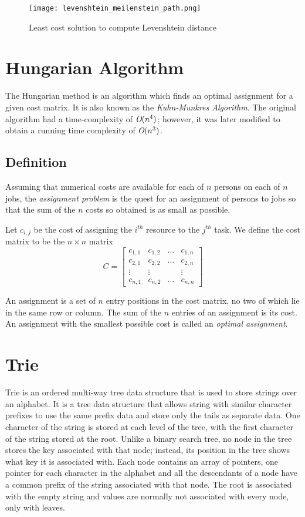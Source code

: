 			\begin{figure}[h!]
				\centering
				\texttt{[image: levenshtein\_meilenstein\_path.png]}
				\caption{Least cost solution to compute Levenshtein distance  \label{levenshtein_path}}
			\end{figure}

	\section{Hungarian Algorithm}
		The Hungarian method is an algorithm which finds an optimal assignment for a given cost matrix. It is also known as the \emph{Kuhn-Munkres Algorithm}. The original algorithm \cite{kuhn1955hungarian} had a time-complexity of \(\emph{O}(n^4)\); however, it was later modified to obtain a running time complexity of \(\emph{O}(n^3)\).
		
		\subsection{Definition}
			Assuming that numerical costs are available for each of \(n\) persons on each of \(n\) jobs, the \emph{assignment problem} is the quest for an assignment of persons to jobs so that the sum of the \(n\) costs so obtained is as small as possible.
			
			Let \(c_{i,j}\) be the cost of assigning the \(i^{th}\) resource to the \(j^{th}\) task. We define the cost matrix to be the \(n \times n\) matrix
		\[ C =
			 \begin{bmatrix}
			 	c_{1,1} &	c_{1,2} &	\dots &	c_{1,n} \\
			 	c_{2,1} &	c_{2,2} &	\dots &	c_{2,n} \\
			 	\vdots &	\vdots &	&	\vdots \\
			 	c_{n,1} &	c_{n,2} &	\dots &	c_{n,n}
			\end{bmatrix}
		\]
		
		An assignment is a set of \(n\) entry positions in the cost matrix, no two of which lie in the same row or column. The sum of the \(n\) entries of an assignment is its cost. An assignment with the smallest possible cost is called an \emph{optimal assignment}.
	
	\section{Trie}
	\label{sec:trie}
		Trie \cite{germann2009tightly} is an ordered multi-way tree data structure that is used to store strings over an alphabet. It is a tree data structure that allows string with similar character prefixes to use the same prefix data and store only the tails as separate data. One character of the string is stored at each level of the tree, with the first character of the string stored at the root. Unlike a binary search tree, no node in the tree stores the key associated with that node; instead, its position in the tree shows what key it is associated with. Each node contains an array of pointers, one pointer for each character in the alphabet and all the descendants of a node have a common prefix of the string associated with that node. The root is associated with the empty string and values are normally not associated with every node, only with leaves.
		

